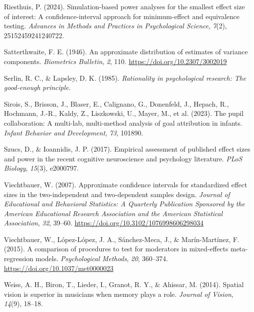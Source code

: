 \documentclass[
  man,floatsintext]{apa7}
\newlength{\cslhangindent}
\newlength{\cslentryspacingunit} %
\newenvironment{CSLReferences}[2] %
 {%
  \setlength{\parindent}{0pt}
  \ifodd #1
  \let\oldpar\par
  \def\par{\hangindent=\cslhangindent\oldpar}
  \fi
  \setlength{\parskip}{#2\cslentryspacingunit}
 }%
 {}
\begin{document}
\begin{CSLReferences}{1}{0}
\leavevmode{}%
Riesthuis, P. (2024). Simulation-based power analyses for the smallest effect size of interest: A confidence-interval approach for minimum-effect and equivalence testing. \emph{Advances in Methods and Practices in Psychological Science}, \emph{7}(2), 25152459241240722.

\leavevmode{}%
Satterthwaite, F. E. (1946). An approximate distribution of estimates of variance components. \emph{Biometrics Bulletin}, \emph{2}, 110. \url{https://doi.org/10.2307/3002019}

\leavevmode{}%
Serlin, R. C., \& Lapsley, D. K. (1985). \emph{Rationality in psychological research: The good-enough principle.}

\leavevmode{}%
Sirois, S., Brisson, J., Blaser, E., Calignano, G., Donenfeld, J., Hepach, R., Hochmann, J.-R., Kaldy, Z., Liszkowski, U., Mayer, M., et al. (2023). The pupil collaboration: A multi-lab, multi-method analysis of goal attribution in infants. \emph{Infant Behavior and Development}, \emph{73}, 101890.

\leavevmode{}%
Szucs, D., \& Ioannidis, J. P. (2017). Empirical assessment of published effect sizes and power in the recent cognitive neuroscience and psychology literature. \emph{PLoS Biology}, \emph{15}(3), e2000797.

\leavevmode{}%
Viechtbauer, W. (2007). Approximate confidence intervals for standardized effect sizes in the two-independent and two-dependent samples design. \emph{Journal of Educational and Behavioral Statistics: A Quarterly Publication Sponsored by the American Educational Research Association and the American Statistical Association}, \emph{32}, 39--60. \url{https://doi.org/10.3102/1076998606298034}

\leavevmode{}%
Viechtbauer, W., López-López, J. A., Sánchez-Meca, J., \& Marín-Martínez, F. (2015). A comparison of procedures to test for moderators in mixed-effects meta-regression models. \emph{Psychological Methods}, \emph{20}, 360--374. \url{https://doi.org/10.1037/met0000023}

\leavevmode{}%
Weiss, A. H., Biron, T., Lieder, I., Granot, R. Y., \& Ahissar, M. (2014). Spatial vision is superior in musicians when memory plays a role. \emph{Journal of Vision}, \emph{14}(9), 18--18.


\end{CSLReferences}
\end{document}

